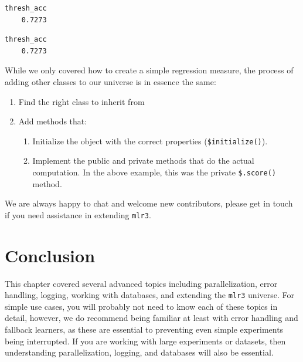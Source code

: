 \begin{verbatim}
thresh_acc 
    0.7273 
\end{verbatim}

\begin{Shaded}
\begin{Highlighting}[]
\SpecialCharTok{::}\SpecialCharTok{$}\NormalTok{(}
\SpecialCharTok{$}\NormalTok{(}\NormalTok{(}\NormalTok{))}
\end{Highlighting}
\end{Shaded}

\begin{verbatim}
thresh_acc 
    0.7273 
\end{verbatim}

While we only covered how to create a simple regression measure, the
process of adding other classes to our universe is in essence the same:

\begin{enumerate}
\def\labelenumi{\arabic{enumi}.}
\tightlist
\item
  Find the right class to inherit from
\item
  Add methods that:

  \begin{enumerate}
  \def\labelenumii{\alph{enumii})}
  \tightlist
  \item
    Initialize the object with the correct properties
    (\texttt{\$initialize()}).
  \item
    Implement the public and private methods that do the actual
    computation. In the above example, this was the private
    \texttt{\$.score()} method.
  \end{enumerate}
\end{enumerate}

We are always happy to chat and welcome new contributors, please get in
touch if you need assistance in extending \texttt{mlr3}.

\hypertarget{conclusion-8}{%
\section{Conclusion}\label{conclusion-8}}

This chapter covered several advanced topics including parallelization,
error handling, logging, working with databases, and extending the
\texttt{mlr3} universe. For simple use cases, you will probably not need
to know each of these topics in detail, however, we do recommend being
familiar at least with error handling and fallback learners, as these
are essential to preventing even simple experiments being interrupted.
If you are working with large experiments or datasets, then
understanding parallelization, logging, and databases will also be
essential.

